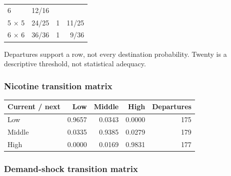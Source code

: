 \documentclass[11pt,]{article}
\begin{document}
\begin{longtable}[]{@{}lrrr@{}}
\begin{minipage}[t]{0.16\columnwidth}
6\strut
\end{minipage} & \begin{minipage}[t]{0.16\columnwidth}\raggedleft\strut
12/16\strut
\end{minipage}\tabularnewline
\begin{minipage}[t]{0.26\columnwidth}\raggedright\strut
5 × 5\strut
\end{minipage} & \begin{minipage}[t]{0.30\columnwidth}\raggedleft\strut
24/25\strut
\end{minipage} & \begin{minipage}[t]{0.16\columnwidth}\raggedleft\strut
1\strut
\end{minipage} & \begin{minipage}[t]{0.16\columnwidth}\raggedleft\strut
11/25\strut
\end{minipage}\tabularnewline
\begin{minipage}[t]{0.26\columnwidth}\raggedright\strut
6 × 6\strut
\end{minipage} & \begin{minipage}[t]{0.30\columnwidth}\raggedleft\strut
36/36\strut
\end{minipage} & \begin{minipage}[t]{0.16\columnwidth}\raggedleft\strut
1\strut
\end{minipage} & \begin{minipage}[t]{0.16\columnwidth}\raggedleft\strut
9/36\strut
\end{minipage}\tabularnewline
\bottomrule
\end{longtable}

Departures support a row, not every destination probability. Twenty is a
descriptive threshold, not statistical adequacy.

\subsubsection{Nicotine transition
matrix}\label{nicotine-transition-matrix}

\begin{longtable}[]{@{}lrrrr@{}}
\toprule
Current / next & Low & Middle & High & Departures\tabularnewline
\midrule
\endhead
Low & 0.9657 & 0.0343 & 0.0000 & 175\tabularnewline
Middle & 0.0335 & 0.9385 & 0.0279 & 179\tabularnewline
High & 0.0000 & 0.0169 & 0.9831 & 177\tabularnewline
\bottomrule
\end{longtable}

\subsubsection{Demand-shock transition
matrix}\label{demand-shock-transition-matrix}
\end{document}
